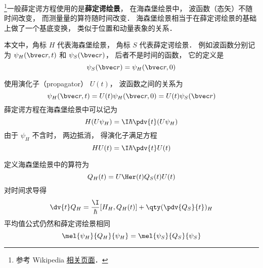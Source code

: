 
\begin{issues}
\issueDraft
\end{issues}


\footnote{参考 Wikipedia \href{https://en.wikipedia.org/wiki/Heisenberg_picture}{相关页面}．}一般薛定谔方程使用的是\textbf{薛定谔绘景}， 在海森堡绘景中， 波函数（态矢）不随时间改变， 而测量量的算符随时间改变． 海森堡绘景相当于在薛定谔绘景的基础上做了一个基底变换， 类似于位置和动量表象的关系．

本文中，角标 $H$ 代表海森堡绘景， 角标 $S$ 代表薛定谔绘景． 例如波函数分别记为 $\psi_H(\bvec r, t)$ 和 $\psi_S(\bvec r)$， 后者不是时间的函数， 它的定义是
\begin{equation}
\psi_S(\bvec r) = \psi_H(\bvec r, 0)
\end{equation}


使用演化子（propagator） $U(t)$， 波函数之间的关系为
\begin{equation}
\psi_H(\bvec r, t) = U(t) \psi_H(\bvec r, 0) = U(t) \psi_S(\bvec r)
\end{equation}
薛定谔方程在海森堡绘景中可以记为
\begin{equation}
H(U\psi_H) = \I\hbar \pdv{t} (U\psi_H)
\end{equation}
由于 $\psi_H$ 不含时， 两边抵消， 得演化子满足方程
\begin{equation}
H U(t) = \I\hbar \pdv{t} U(t)
\end{equation}

定义海森堡绘景中的算符为
\begin{equation}
Q_H(t) = U\Her(t) Q_S(t) U(t)
\end{equation}
对时间求导得
\begin{equation}
\dv{t}Q_H = \frac{\I}{\hbar} [H_H, Q_H(t)] + \qty(\pdv{Q_S}{t})_H
\end{equation}
平均值公式仍然和薛定谔绘景相同
\begin{equation}
\mel{\psi_H}{Q_H}{\psi_H} = \mel{\psi_S}{Q_S}{\psi_S}
\end{equation}
